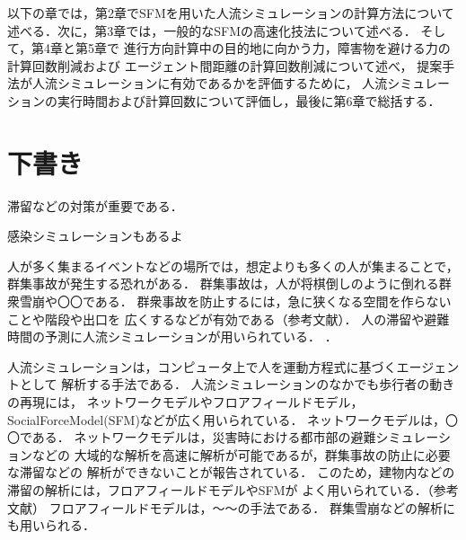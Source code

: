 以下の章では，第2章でSFMを用いた人流シミュレーションの計算方法について
述べる．次に，第3章では，一般的なSFMの高速化技法について述べる．
そして，第4章と第5章で
進行方向計算中の目的地に向かう力，障害物を避ける力の計算回数削減および
エージェント間距離の計算回数削減について述べ，
提案手法が人流シミュレーションに有効であるかを評価するために，
人流シミュレーションの実行時間および計算回数について評価し，最後に第6章で総括する．


\clearpage
\section{下書き}
滞留などの対策が重要である\cite{taisaku1}\cite{taisaku2}．

感染シミュレーションもあるよ\cite{mas_pandemic}

人が多く集まるイベントなどの場所では，想定よりも多くの人が集まることで，
群集事故が発生する恐れがある．
群集事故は，人が将棋倒しのように倒れる群衆雪崩や〇〇である．
群衆事故を防止するには，急に狭くなる空間を作らないことや階段や出口を
広くするなどが有効である（参考文献）．
人の滞留や避難時間の予測に人流シミュレーションが用いられている．
\cite{sim_jirei1}\cite{sim_jirei2}\cite{sim_jirei3}\cite{sim_jirei8}\cite{sim_jirei7}．

人流シミュレーションは，コンピュータ上で人を運動方程式に基づくエージェントとして
解析する手法である．
人流シミュレーションのなかでも歩行者の動きの再現には，
ネットワークモデルやフロアフィールドモデル，SocialForceModel(SFM)などが広く用いられている\cite{helbing_sfm}\cite{sfm_ntt}．
ネットワークモデルは，〇〇である．
ネットワークモデルは，災害時における都市部の避難シミュレーションなどの
大域的な解析を高速に解析が可能であるが，群集事故の防止に必要な滞留などの
解析ができないことが報告されている．
このため，建物内などの滞留の解析には，フロアフィールドモデルやSFMが
よく用いられている．（参考文献）
フロアフィールドモデルは，～～の手法である\cite{floa_field1}\cite{floa_field2}．
群集雪崩などの解析にも用いられる\cite{floa_field3}．



